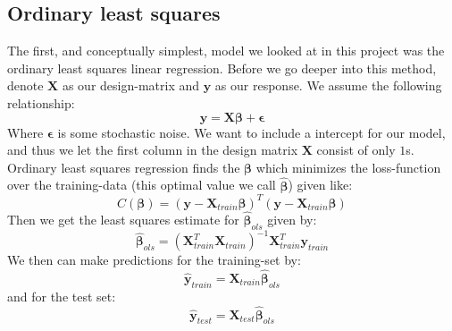 \documentclass{article}
\begin{document}
\subsection{Ordinary least squares}
The first, and conceptually simplest, model we looked at in this project was the
ordinary least squares linear regression. Before we go deeper into this
method, denote $\mathbf{X}$ as our design-matrix and $\mathbf{y}$ as our
response. We assume the following relationship:
$$\mathbf{y} = \mathbf{X} \bm{\beta} + \bm{\epsilon}$$
Where $\bm{\epsilon}$ is some stochastic noise.
We want to include a intercept for our model, and thus we let the first column
in the design matrix $\mathbf{X}$ consist of only $1$s. Ordinary least squares
regression finds the $\bm{\beta}$ which minimizes the loss-function over the
training-data (this optimal value we call $\hat{\bm{\beta}}$) given like:
$$C(\bm{\beta}) = (\mathbf{y} - \mathbf{X}_{train} \bm{\beta})^T (\mathbf{y} - \mathbf{X}_{train} \bm{\beta})$$
Then we get the least squares estimate for $\hat{\bm{\beta}}_{ols}$ given by:
$$\hat{\bm{\beta}}_{ols} = (\mathbf{X}^T_{train} \mathbf{X}_{train})^{-1} \mathbf{X}^T_{train} \mathbf{y}_{train}$$
We then can make predictions for the training-set by:
$$\hat{\mathbf{y}}_{train} = \mathbf{X}_{train} \hat{\bm{\beta}}_{ols}$$
and for the test set:
$$\hat{\mathbf{y}}_{test} = \mathbf{X}_{test} \hat{\bm{\beta}}_{ols}$$
\end{document}
